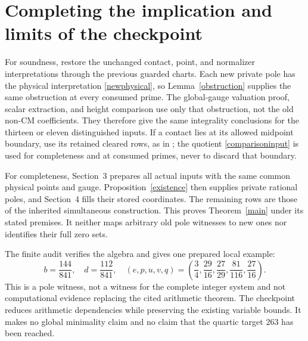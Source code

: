 \documentclass[11pt]{article}
\begin{document}
\section{Completing the implication and limits of the checkpoint}

For soundness, restore the unchanged contact, point, and normalizer
interpretations through the previous guarded charts. Each new
private pole has the physical interpretation \eqref{newphysical},
so Lemma~\ref{obstruction} supplies the same obstruction at every
consumed prime. The global-gauge valuation proof, scalar extraction,
and height comparison use only that obstruction, not the old
non-CM coefficients. They therefore give the same integrality
conclusions for the thirteen or eleven distinguished inputs.
If a contact lies at its allowed midpoint boundary, use its
retained cleared rows, as in \cite{global}; the quotient
\eqref{comparisoninput} is used for completeness and at consumed
primes, never to discard that boundary.

For completeness, Section~3 prepares all actual inputs with the
same common physical points and gauge. Proposition~\ref{existence}
then supplies private rational poles, and Section~4 fills their
stored coordinates. The remaining rows are those of the inherited
simultaneous construction. This proves Theorem~\ref{main} under
its stated premises. It neither maps arbitrary old pole witnesses
to new ones nor identifies their full zero sets.

The finite audit verifies the algebra and gives one prepared local
example:
\[
 b=\frac{144}{841},\quad d=\frac{112}{841},\quad
 (e,p,u,v,q)=\left(\frac34,\frac{29}{16},
                 \frac{27}{29},\frac{81}{116},\frac{27}{16}\right).
\]
This is a pole witness, not a witness for the complete integer
system and not computational evidence replacing the cited arithmetic
theorem. The checkpoint reduces arithmetic dependencies while
preserving the existing variable bounds. It makes no global
minimality claim and no claim that the quartic target $263$ has
been reached.
\end{document}

